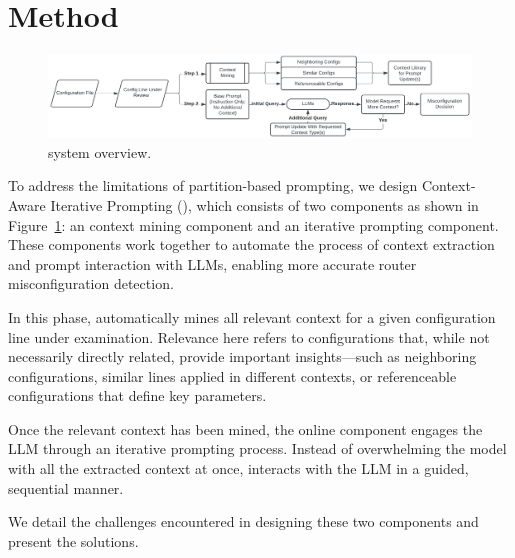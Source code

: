 \section{Method}
\label{sec:method}

\begin{figure}[t]
    \centering
    \includegraphics[width=\linewidth]{figs/caip_space.pdf}
    \caption{\sysname{} system overview.}
    \label{fig:overview}
\end{figure}

To address the limitations of partition-based prompting, we design Context-Aware Iterative Prompting (\sysname{}), which consists of two components as shown in Figure~\ref{fig:overview}: an context mining component and an iterative prompting component. These components work together to automate the process of context extraction and prompt interaction with LLMs, enabling more accurate router misconfiguration detection.


In this phase, \sysname{} automatically mines all relevant context for a given configuration line under examination. Relevance here refers to configurations that, while not necessarily directly related, provide important insights—such as neighboring configurations, similar lines applied in different contexts, or referenceable configurations that define key parameters.


Once the relevant context has been mined, the online component engages the LLM through an iterative prompting process. Instead of overwhelming the model with all the extracted context at once, \sysname{} interacts with the LLM in a guided, sequential manner.



We detail the challenges encountered in designing these two components and present the solutions.

